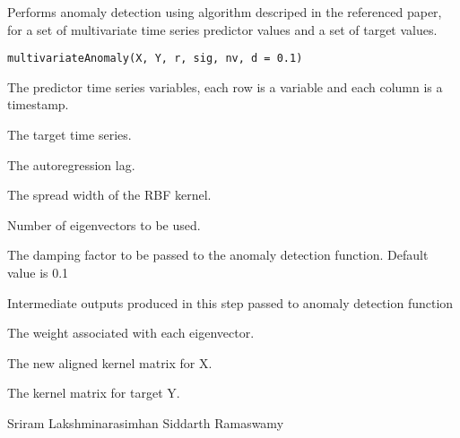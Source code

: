 \begin{Description}\relax
Performs anomaly detection using algorithm descriped in the referenced paper, for a set of multivariate time series predictor values and a set of target values.
\end{Description}
\begin{Usage}
\begin{verbatim}
multivariateAnomaly(X, Y, r, sig, nv, d = 0.1)
\end{verbatim}
\end{Usage}
\begin{Arguments}
\begin{ldescription}
\item[\code{X}] The predictor time series variables, each row is a variable and each column is a timestamp.

\item[\code{Y}] The target time series.

\item[\code{r}] The autoregression lag.

\item[\code{sig}] The spread width of the RBF kernel.

\item[\code{nv}] Number of eigenvectors to be used.

\item[\code{d}] The damping factor to be passed to the anomaly detection function. Default value is 0.1

\end{ldescription}
\end{Arguments}
\begin{Value}
Intermediate outputs produced in this step passed to anomaly detection function

\begin{ldescription}
\item[\code{w}] The weight associated with each eigenvector.

\item[\code{KX}] The new aligned kernel matrix for X.

\item[\code{KY}] The kernel matrix for target Y.

\end{ldescription}
\end{Value}
\begin{Author}\relax
Sriram Lakshminarasimhan
Siddarth Ramaswamy
\end{Author}
